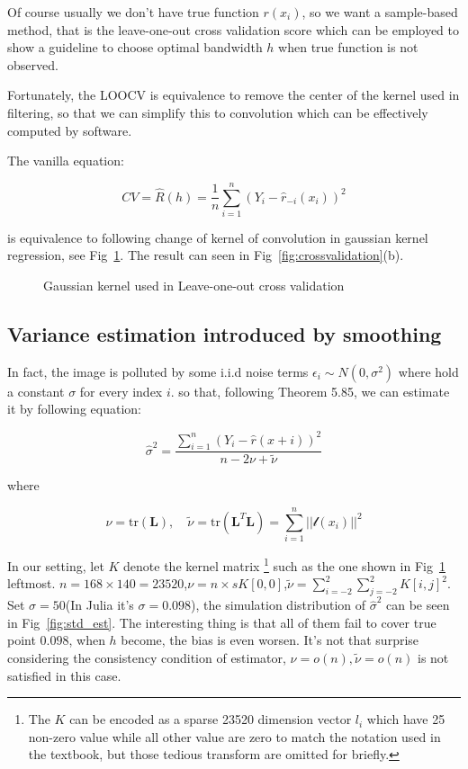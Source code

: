 \documentclass{article}
\begin{document}
Of course usually we don't have true function $r(x_i)$, so we want a sample-based method, 
that is the leave-one-out cross validation score which can be employed to show a guideline to choose optimal bandwidth $h$
when true function is not observed.

Fortunately, the LOOCV is equivalence to remove the center of the kernel used in filtering, so that we can simplify this to 
convolution which can be effectively computed by software.

The vanilla equation:

$$
CV = \hat{R}(h)=\frac{1}{n}\sum_{i=1}^n (Y_i-\hat{r}_{-i}(x_i))^2
$$

is equivalence to following change of kernel of convolution in gaussian kernel regression, see Fig~\ref{fig:gaussian_kernel}. 
The result can seen in Fig~\ref{fig:crossvalidation}(b).

\begin{figure}[htb]
  \centering
  
  \caption{Gaussian kernel used in Leave-one-out cross validation}
  \label{fig:gaussian_kernel}
\end{figure}


\subsection{Variance estimation introduced by smoothing}

In fact, the image is polluted by some i.i.d noise terms $\epsilon_i \sim N(0,\sigma^2)$ where hold a constant $\sigma$ for every index $i$.
so that, following \cite{wasserman2006all} Theorem 5.85, we can estimate it by following equation:

$$
\hat{\sigma}^2=\frac{\sum_{i=1}^n (Y_i-\hat{r}(x+i))^2}{n-2\nu+\tilde{\nu}}
$$

where

$$
\nu = \mathrm{tr}(\mathbf{L}), \quad \tilde{\nu}=\mathrm{tr}(\mathbf{L}^T\mathbf{L})=\sum_{i=1}^n||\mathcal{l}(x_i)||^2
$$

In our setting, let $K$ denote the kernel matrix
\footnote{The $K$ can be encoded as a sparse 23520 dimension vector $l_i$ which have 25 non-zero value while all other value are zero to match
the notation used in the textbook, but those tedious transform are omitted for briefly.}
such as the one shown in Fig~\ref{fig:gaussian_kernel} leftmost.
$n = 168 \times 140 = 23520$,$\nu = n \times sK[0,0]$,$\tilde{\nu} = \sum_{i=-2}^2\sum_{j=-2}^2 K[i,j]^2$. Set $\sigma=50$(In Julia it's 
$\sigma=0.098$), the simulation distribution of $\hat{\sigma}^2$ can be seen in Fig~\ref{fig:std_est}. 
The interesting thing is that all of them fail to cover true point $0.098$, when $h$ become, the bias is even worsen. It's not that 
surprise considering the consistency condition of estimator, $\nu=o(n),\tilde{\nu}=o(n)$ is not satisfied in this case.
\end{document}
